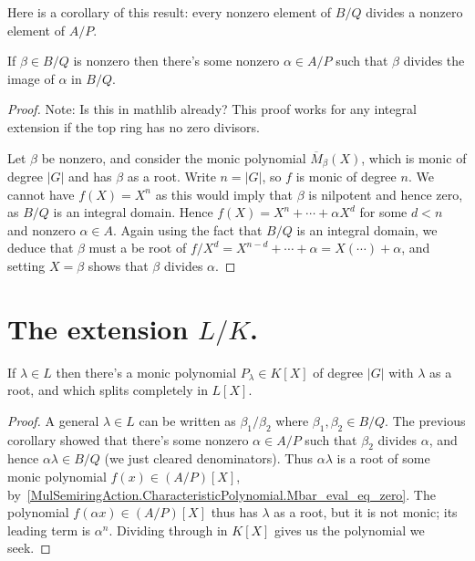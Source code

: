 Here is a corollary of this result: every nonzero element of $B/Q$ divides
a nonzero element of $A/P$.
\begin{corollary}
  \label{Algebra.exists_dvd_nonzero_if_isIntegral}
  If $\beta\in B/Q$ is nonzero then there's some nonzero $\alpha\in A/P$
  such that $\beta$ divides the image of $\alpha$ in $B/Q$.
\end{corollary}
\begin{proof} Note: Is this in mathlib already? This proof works for any
  integral extension if the top ring has no zero divisors.

  Let $\beta$ be nonzero, and
  consider the monic polynomial $\overline{M}_\beta(X)$, which is monic of
  degree $|G|$ and has $\beta$ as a root. Write $n=|G|$, so $f$ is monic
  of degree $n$. We cannot have $f(X)=X^n$ as this would imply that $\beta$ is
  nilpotent and hence zero, as $B/Q$ is an integral domain. Hence $f(X)=X^n+\cdots +\alpha X^d$
  for some $d<n$ and nonzero $\alpha\in A$. Again using the fact that $B/Q$ is an integral domain, we
  deduce that $\beta$ must a be root of $f/X^d=X^{n-d}+\cdots+\alpha=X(\cdots)+\alpha$, and setting
  $X=\beta$ shows that $\beta$ divides $\alpha$.
\end{proof}

\section{The extension $L/K$.}

\begin{theorem}
  \label{foo1}
If $\lambda\in L$ then there's a monic polynomial $P_\lambda\in K[X]$ of degree $|G|$
with $\lambda$ as a root, and which splits completely in $L[X]$.
\end{theorem}
\begin{proof}
  A general $\lambda\in L$ can be written as $\beta_1/\beta_2$ where $\beta_1,\beta_2\in B/Q$.
  The previous corollary showed that there's some nonzero $\alpha\in A/P$ such that $\beta_2$
  divides $\alpha$, and hence $\alpha\lambda\in B/Q$ (we just cleared denominators).
  Thus $\alpha\lambda$ is a root of some monic polynomial $f(x)\in (A/P)[X]$,
  by~\ref{MulSemiringAction.CharacteristicPolynomial.Mbar_eval_eq_zero}.
  The polynomial $f(\alpha x)\in (A/P)[X]$ thus
  has $\lambda$ as a root, but it is not monic; its leading term is $\alpha^n$.
  Dividing through in $K[X]$ gives us the polynomial we seek.
\end{proof}

